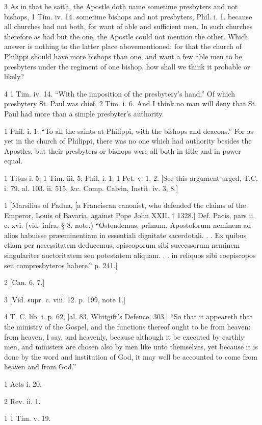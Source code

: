 3
As in that he saith, the Apostle doth name sometime presbyters and not bishops, 1 Tim. iv. 14. sometime bishops and not presbyters, Phil. i. 1. because all churches had not both, for want of able and sufficient men. In such churches therefore as had but the one, the Apostle could not mention the other. Which answer is nothing to the latter place abovementioned: for that the church of Philippi should have more bishops than one, and want a few able men to be presbyters under the regiment of one bishop, how shall we think it probable or likely?

4
1 Tim. iv. 14. “With the imposition of the presbytery’s hand.” Of which presbytery St. Paul was chief, 2 Tim. i. 6. And I think no man will deny that St. Paul had more than a simple presbyter’s authority.

1
Phil. i. 1. “To all the saints at Philippi, with the bishops and deacons.” For as yet in the church of Philippi, there was no one which had authority besides the Apostles, but their presbyters or bishops were all both in title and in power equal.

1
Titus i. 5; 1 Tim. iii. 5; Phil. i. 1; 1 Pet. v. 1, 2. [See this argument urged, T.C. i. 79. al. 103. ii. 515, &c. Comp. Calvin, Instit. iv. 3, 8.]

1
[Marsilius of Padua, [a Franciscan canonist, who defended the claims of the Emperor, Louis of Bavaria, against Pope John XXII. † 1328.] Def. Pacis, pars ii. c. xvi. (vid. infra, § 8. note.) “Ostendemus, primum, Apostolorum neminem ad alios habuisse præeminentiam in essentiali dignitate sacerdotali. . . Ex quibus etiam per necessitatem deducemus, episcoporum sibi successorum neminem singulariter auctoritatem seu potestatem aliquam. . . in reliquos sibi coepiscopos seu compresbyteros habere.” p. 241.]

2
[Can. 6, 7.]

3
[Vid. supr. c. viii. 12. p. 199, note 1.]

4
T. C. lib. i. p. 62, [al. 83. Whitgift’s Defence, 303.] “So that it appeareth that the ministry of the Gospel, and the functions thereof ought to be from heaven: from heaven, I say, and heavenly, because although it be executed by earthly men, and ministers are chosen also by men like unto themselves, yet because it is done by the word and institution of God, it may well be accounted to come from heaven and from God.”

1
Acts i. 20.

2
Rev. ii. 1.

1
1 Tim. v. 19.

